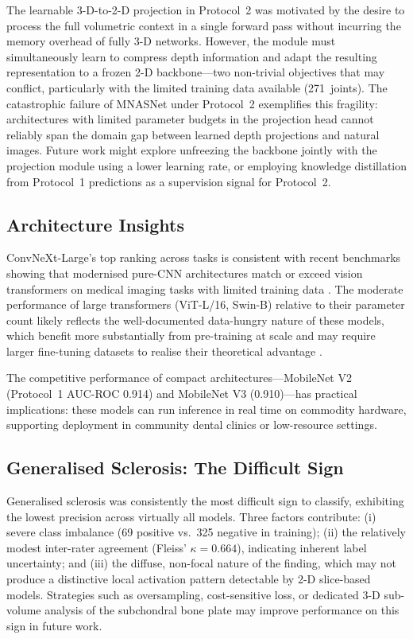\documentclass[review,12pt]{elsarticle}
\begin{document}
The learnable 3-D-to-2-D projection in Protocol~2 was motivated by the
desire to process the full volumetric context in a single forward pass
without incurring the memory overhead of fully 3-D networks. However,
the module must simultaneously learn to compress depth information and
adapt the resulting representation to a frozen 2-D backbone---two
non-trivial objectives that may conflict, particularly with the limited
training data available (271~joints). The catastrophic failure of MNASNet
under Protocol~2 exemplifies this fragility: architectures with limited
parameter budgets in the projection head cannot reliably span the
domain gap between learned depth projections and natural images. Future
work might explore unfreezing the backbone jointly with the projection
module using a lower learning rate, or employing knowledge distillation
from Protocol~1 predictions as a supervision signal for Protocol~2.

\subsection{Architecture Insights}

ConvNeXt-Large's top ranking across tasks is consistent with recent
benchmarks showing that modernised pure-CNN architectures match or exceed
vision transformers on medical imaging tasks with limited training
data \cite{liu2022convnet}. The moderate performance of
large transformers (ViT-L/16, Swin-B) relative to their parameter count
likely reflects the well-documented data-hungry nature of these models,
which benefit more substantially from pre-training at scale and may
require larger fine-tuning datasets to realise their theoretical
advantage \cite{dosovitskiy2020image,raghu2021vision}.

The competitive performance of compact architectures---MobileNet V2
(Protocol~1 AUC-ROC 0.914) and MobileNet V3 (0.910)---has practical
implications: these models can run inference in real time on
commodity hardware, supporting deployment in community dental
clinics or low-resource settings.

\subsection{Generalised Sclerosis: The Difficult Sign}

Generalised sclerosis was consistently the most difficult sign to classify,
exhibiting the lowest precision across virtually all models. Three factors
contribute: (i) severe class imbalance (69 positive vs.\ 325 negative
in training); (ii) the relatively modest inter-rater agreement
(Fleiss' $\kappa = 0.664$), indicating inherent label uncertainty; and
(iii) the diffuse, non-focal nature of the finding, which may not produce
a distinctive local activation pattern detectable by 2-D slice-based
models. Strategies such as oversampling, cost-sensitive loss, or
dedicated 3-D sub-volume analysis of the subchondral bone plate may
improve performance on this sign in future work.
\end{document}
